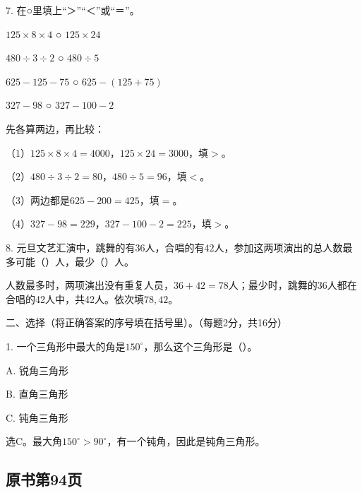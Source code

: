 7. 在○里填上“＞”“＜”或“＝”。\par \(125\times8\times4\) ○ \(125\times24\)\par \(480\div3\div2\) ○ \(480\div5\)\par \(625-125-75\) ○ \(625-(125+75)\)\par \(327-98\) ○ \(327-100-2\)\par
\begin{BookAnswer}
先各算两边，再比较：\par （1）\(125\times8\times4=4000\)，\allowbreak{}\(125\times24=3000\)，填\(>\)。\par （2）\(480\div3\div2=80\)，\allowbreak{}\(480\div5=96\)，填\(<\)。\par （3）两边都是\(625-200=425\)，填\(=\)。\par （4）\(327-98=229\)，\allowbreak{}\(327-100-2=225\)，填\(>\)。
\end{BookAnswer}

8. 元旦文艺汇演中，跳舞的有\(36\)人，合唱的有\(42\)人，参加这两项演出的总人数最多可能（\hspace{1.8em}）人，最少（\hspace{1.8em}）人。\par
\begin{BookAnswer}
人数最多时，两项演出没有重复人员，\allowbreak{}\(36+42=78\)人；最少时，跳舞的36人都在合唱的42人中，共42人。依次填\(78,42\)。
\end{BookAnswer}

二、选择（将正确答案的序号填在括号里）。（每题2分，共16分）\par 1. 一个三角形中最大的角是\(150^\circ\)，那么这个三角形是（\hspace{1.8em}）。\par
\noindent A. 锐角三角形\par
\noindent B. 直角三角形\par
\noindent C. 钝角三角形\par
\begin{BookAnswer}
选C。最大角\(150^\circ>90^\circ\)，有一个钝角，因此是钝角三角形。
\end{BookAnswer}



\subsection*{原书第94页}

